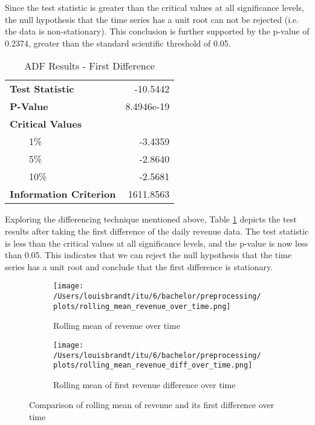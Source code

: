 Since the test statistic is greater than the critical values at all
significance levels, the null hypothesis that the time series has a unit root
can not be rejected (i.e. the data is non-stationary). This conclusion is
further supported by the p-value of 0.2374, greater than the standard
scientific threshold of 0.05.
\begin{table}[h]
\centering
\caption{ADF Results - First Difference}
\label{tab:adf_dif}
\begin{tabular}{@{} >{\arraybackslash}l r @{}}
\toprule
\textbf{Test Statistic} & -10.5442 \\ \addlinespace[0.1em]
\textbf{P-Value} & 8.4946e-19 \\ \addlinespace[0.1em]
\textbf{Critical Values} & \\ 
\ \ \ \ 1\% & -3.4359 \\ 
\ \ \ \ 5\% & -2.8640 \\ 
\ \ \ \ 10\% & -2.5681 \\ \addlinespace[0.1em]
\textbf{Information Criterion} & 1611.8563 \\ 
\bottomrule
\end{tabular}
\end{table}

Exploring the differencing technique mentioned above, Table \ref{tab:adf_dif}
depicts the test results after taking the first difference of the daily
revenue data. The test statistic is less than the critical values at all
significance levels, and the p-value is now less than 0.05. This indicates that
we can reject the null hypothesis that the time series has a unit root and
conclude that the first difference is stationary.
\begin{figure}[h]
\centering
\begin{subfigure}[b]{0.49\textwidth}
\centering
\texttt{[image: /Users/louisbrandt/itu/6/bachelor/preprocessing/plots/rolling\_mean\_revenue\_over\_time.png]}
\caption{Rolling mean of revenue over time}
\label{fig:rolling_revenue_mean}
\end{subfigure}
\hfill
\begin{subfigure}[b]{0.49\textwidth}
\centering
\texttt{[image: /Users/louisbrandt/itu/6/bachelor/preprocessing/plots/rolling\_mean\_revenue\_diff\_over\_time.png]}
\caption{Rolling mean of first revenue difference over time}
\label{fig:rolling_revenue_diff}
\end{subfigure}
\caption{Comparison of rolling mean of revenue and its first difference over time}
\label{fig:stationarity}
\end{figure}

